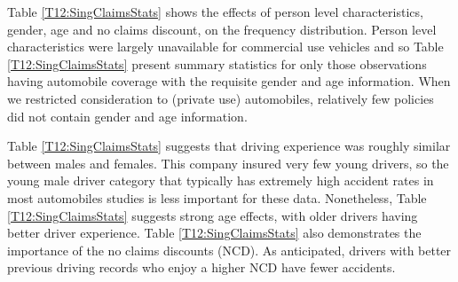 {Table \ref{T12:SingClaimsStats} shows the effects of person level
characteristics, gender, age and no claims discount, on the
frequency distribution. Person level characteristics were largely
unavailable for commercial use vehicles and so Table
\ref{T12:SingClaimsStats} present summary statistics for only those
observations having automobile coverage with the requisite gender
and age information. When we restricted consideration to (private
use) automobiles, relatively few policies did not contain gender and
age information.

Table \ref{T12:SingClaimsStats} suggests that driving experience was
roughly similar between males and females. This company insured very
few young drivers, so the young male driver category that typically
has extremely high accident rates in most automobiles studies is
less important for these data. Nonetheless, Table
\ref{T12:SingClaimsStats} suggests strong age effects, with older
drivers having better driver experience. Table
\ref{T12:SingClaimsStats} also demonstrates the importance of the no
claims discounts (NCD). As anticipated, drivers with better previous
driving records who enjoy a higher NCD have fewer accidents.

}
